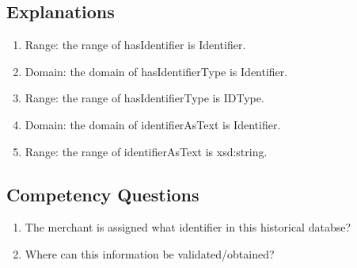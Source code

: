 \subsection{Explanations}
\label{exp:Identifier}
\begin{enumerate}
\item Range: the range of \textsf{hasIdentifier} is \textsf{Identifier}.
\item Domain: the domain of \textsf{hasIdentifierType} is \textsf{Identifier}.
\item Range: the range of \textsf{hasIdentifierType} is \textsf{IDType}.
\item Domain: the domain of \textsf{identifierAsText} is \textsf{Identifier}.
\item Range: the range of \textsf{identifierAsText} is \textsf{xsd:string}.
\end{enumerate}

\subsection{Competency Questions}
\label{cqs:Identifier}
\begin{enumerate}[CQ1.]
\item The merchant is assigned what identifier in this historical databse?
\item Where can this information be validated/obtained?
\end{enumerate}

\newpage
